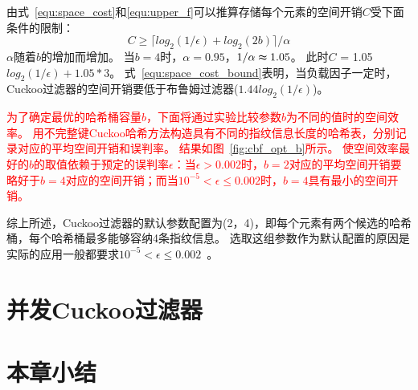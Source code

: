 由式~\ref{equ:space_cost}和\ref{equ:upper_f}可以推算存储每个元素的空间开销$C$受下面条件的限制：
\begin{equation}
C \geq {\lceil log_2({1/\epsilon}) + log_2(2b)\rceil /\alpha}
\label{equ:space_cost_bound}
\end{equation}
$\alpha$随着$b$的增加而增加。
当$b = 4$时，$\alpha = 0.95$，${1/\alpha} \thickapprox 1.05$。
此时$C$ = 1.05$log_2({1/\epsilon}) + 1.05\ast 3$。
式~\ref{equ:space_cost_bound}表明，当负载因子一定时，Cuckoo过滤器的空间开销要低于布鲁姆过滤器($1.44log_2({1/\epsilon})$)。

\textcolor{red}{为了确定最优的哈希桶容量$b$，下面将通过实验比较参数$b$为不同的值时的空间效率。
用不完整键Cuckoo哈希方法构造具有不同的指纹信息长度的哈希表，分别记录对应的平均空间开销和误判率。
结果如图~\ref{fig:cbf_opt_b}所示。
使空间效率最好的$b$的取值依赖于预定的误判率$\epsilon$：当$\epsilon > 0.002 $时，$b = 2$对应的平均空间开销要略好于$b = 4$对应的空间开销；而当$ 10^{-5} < \epsilon \leq 0.002$时，$b = 4$具有最小的空间开销。}

综上所述，Cuckoo过滤器的默认参数配置为(2，4)，即每个元素有两个候选的哈希桶，每个哈希桶最多能够容纳4条指纹信息。
选取这组参数作为默认配置的原因是实际的应用一般都要求$ 10^{-5} < \epsilon \leq 0.002$~\cite{broder2004network}。

\section{并发Cuckoo过滤器}

\subsection{}
\subsection{}
\subsection{}





















\section{本章小结}